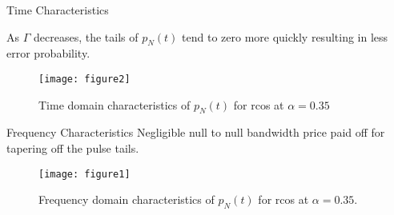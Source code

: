 \documentclass[10pt]{beamer}
\begin{document}
\begin{frame}
\begin{block}{Time Characteristics}

As $\Gamma$ decreases, the tails of $p_{N}(t)$ tend to zero more quickly resulting in less error probability.
\begin{figure}[h]
    \centering
    \texttt{[image: figure2]}
    \caption{Time domain characteristics of $p_{N}(t)$ for rcos at $\alpha = 0.35$}
\end{figure}
\end{block}
\begin{block}{Frequency Characteristics}
Negligible null to null bandwidth price paid off for tapering off the pulse tails.
\begin{figure}[h]
    \centering
    \texttt{[image: figure1]}
    \caption{Frequency domain characteristics of $p_{N}(t)$ for rcos at $\alpha = 0.35$.}
\end{figure}

\end{block} 
\end{frame}
\end{document}

